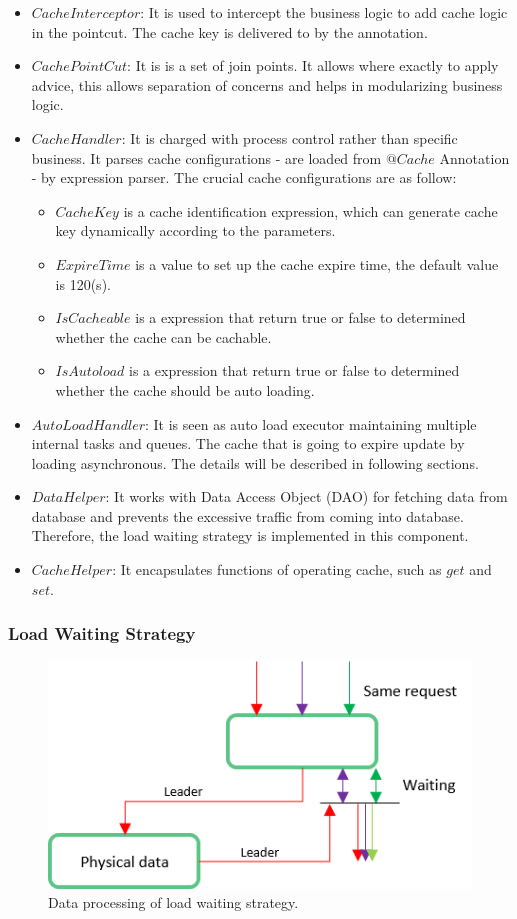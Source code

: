 \documentclass{singlecol-new}
\theoremstyle{TH}{
\newtheorem{lemma}{Lemma}
\newtheorem{theorem}[lemma]{Theorem}
\newtheorem{corrolary}[lemma]{Corrolary}
\newtheorem{conjecture}[lemma]{Conjecture}
\newtheorem{proposition}[lemma]{Proposition}
\newtheorem{claim}[lemma]{Claim}
\newtheorem{stheorem}[lemma]{Wrong Theorem}
}
\theoremstyle{THrm}{
\newtheorem{definition}{Definition}[section]
\newtheorem{question}{Question}[section]
\newtheorem{remark}{Remark}
\newtheorem{scheme}{Scheme}
}
\theoremstyle{THhit}{
\newtheorem{case}{Case}[section]
}
\begin{document}
\begin{itemize}
    \item $CacheInterceptor$: It is used to intercept the business logic to add cache logic in the pointcut. The cache key is delivered to by the annotation.
    \item $CachePointCut$: It is is a set of join points. It allows where exactly to apply advice, this allows separation of concerns and helps in modularizing business logic.
    \item $CacheHandler$: It is charged with process control rather than specific business. It parses cache configurations - are loaded from $@Cache$ Annotation - by expression parser. The crucial cache configurations are as follow:
    \begin{itemize}
        \item $CacheKey$ is a cache identification expression, which can generate cache key dynamically according to the parameters.
        \item $ExpireTime$ is a value to set up the cache expire time, the default value is 120(s).
        \item $IsCacheable$ is a expression that return true or false to determined whether the cache can be cachable.
        \item $IsAutoload$ is a expression that return true or false to determined whether the cache should be auto loading.
    \end{itemize}
    \item $AutoLoadHandler$: It is seen as auto load executor maintaining multiple internal tasks and queues. The cache that is going to expire update by loading asynchronous. The details will be described in following sections.
    \item $DataHelper$: It works with Data Access Object (DAO) for fetching data from database and prevents the excessive traffic from coming into database. Therefore, the load waiting strategy is implemented in this component.
    \item $CacheHelper$: It encapsulates functions of operating cache, such as $get$ and $set$.
\end{itemize}

\subsubsection{Load Waiting Strategy}

\begin{figure} [htb]
\centering
\includegraphics[width=0.8\linewidth]{img/loadwaiting}
\caption{\label{loadwaiting}Data processing of load waiting strategy.}
\end{figure}
\end{document}
